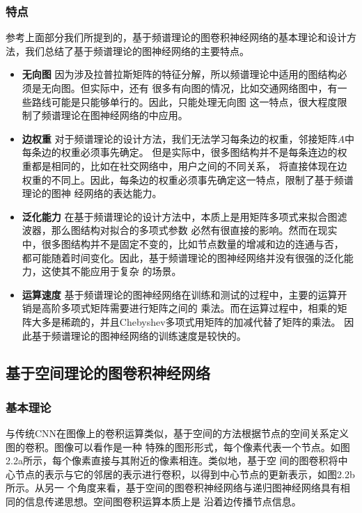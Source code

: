 \subsubsection{特点}
参考上面部分我们所提到的，基于频谱理论的图卷积神经网络的基本理论和设计方法，我们总结了基于频谱理论的图神经网络的主要特点。
\begin{itemize}
    \item \textbf{无向图} \quad
    因为涉及拉普拉斯矩阵的特征分解，所以频谱理论中适用的图结构必须是无向图。但实际中，还有
    很多有向图的情况，比如交通网络图中，有一些路线可能是只能够单行的。因此，只能处理无向图
    这一特点，很大程度限制了频谱理论在图神经网络的中应用。
    
    \item \textbf{边权重} \quad
    对于频谱理论的设计方法，我们无法学习每条边的权重，邻接矩阵$A$中每条边的权重必须事先确定。
    但是实际中，很多图结构并不是每条连边的权重都是相同的，比如在社交网络中，用户之间的不同关系，
    将直接体现在边权重的不同上。因此，每条边的权重必须事先确定这一特点，限制了基于频谱理论的图神
    经网络的表达能力。

    \item \textbf{泛化能力} \quad
    在基于频谱理论的设计方法中，本质上是用矩阵多项式来拟合图滤波器，那么图结构对拟合的多项式参数
    必然有很直接的影响。然而在现实中，很多图结构并不是固定不变的，比如节点数量的增减和边的连通与否，
    都可能随着时间变化。因此，基于频谱理论的图神经网络并没有很强的泛化能力，这使其不能应用于复杂
    的场景。

    \item \textbf{运算速度} \quad
    基于频谱理论的图神经网络在训练和测试的过程中，主要的运算开销是高阶多项式矩阵需要进行矩阵之间的
    乘法。而在运算过程中，相乘的矩阵大多是稀疏的，并且Chebyshev多项式用矩阵的加减代替了矩阵的乘法。
    因此基于频谱理论的图神经网络的训练速度是较快的。
\end{itemize}

\subsection{基于空间理论的图卷积神经网络}
\subsubsection{基本理论}
与传统CNN在图像上的卷积运算类似，基于空间的方法根据节点的空间关系定义图的卷积。图像可以看作是一种
特殊的图形形式，每个像素代表一个节点。如图2.2a所示，每个像素直接与其附近的像素相连。类似地，基于空
间的图卷积将中心节点的表示与它的邻居的表示进行卷积，以得到中心节点的更新表示，如图2.2b所示。从另一
个角度来看，基于空间的图卷积神经网络与递归图神经网络具有相同的信息传递思想。空间图卷积运算本质上是
沿着边传播节点信息。

